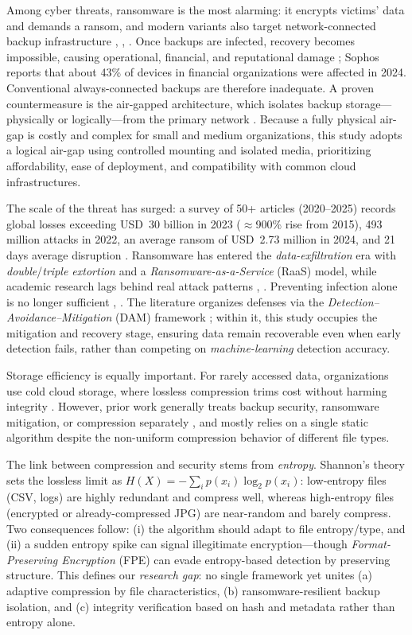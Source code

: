 \documentclass{iaesarticle}
\begin{document}
Among cyber threats, ransomware is the most alarming: it encrypts victims' data and demands a ransom, and modern variants also target network-connected backup infrastructure \cite{6}, \cite{7}, \cite{8}. Once backups are infected, recovery becomes impossible, causing operational, financial, and reputational damage \cite{9}; Sophos reports that about 43\% of devices in financial organizations were affected in 2024. Conventional always-connected backups are therefore inadequate. A proven countermeasure is the air-gapped architecture, which isolates backup storage---physically or logically---from the primary network \cite{10}. Because a fully physical air-gap is costly and complex for small and medium organizations, this study adopts a logical air-gap using controlled mounting and isolated media, prioritizing affordability, ease of deployment, and compatibility with common cloud infrastructures.

The scale of the threat has surged: a survey of 50+ articles (2020--2025) records global losses exceeding USD~30 billion in 2023 ($\approx$900\% rise from 2015), 493 million attacks in 2022, an average ransom of USD~2.73 million in 2024, and 21 days average disruption \cite{41}. Ransomware has entered the \textit{data-exfiltration} era with \textit{double}/\textit{triple extortion} and a \textit{Ransomware-as-a-Service} (RaaS) model, while academic research lags behind real attack patterns \cite{23}, \cite{26}. Preventing infection alone is no longer sufficient \cite{42}, \cite{46}. The literature organizes defenses via the \textit{Detection--Avoidance--Mitigation} (DAM) framework \cite{42}; within it, this study occupies the mitigation and recovery stage, ensuring data remain recoverable even when early detection fails, rather than competing on \textit{machine-learning} detection accuracy.

Storage efficiency is equally important. For rarely accessed data, organizations use cold cloud storage, where lossless compression trims cost without harming integrity \cite{13}. However, prior work generally treats backup security, ransomware mitigation, or compression separately \cite{14}, and mostly relies on a single static algorithm despite the non-uniform compression behavior of different file types.

The link between compression and security stems from \textit{entropy}. Shannon's theory sets the lossless limit as $H(X) = -\sum_{i} p(x_i)\log_2 p(x_i)$: low-entropy files (CSV, logs) are highly redundant and compress well, whereas high-entropy files (encrypted or already-compressed JPG) are near-random and barely compress. Two consequences follow: (i) the algorithm should adapt to file entropy/type, and (ii) a sudden entropy spike can signal illegitimate encryption---though \textit{Format-Preserving Encryption} (FPE) can evade entropy-based detection by preserving structure. This defines our \textit{research gap}: no single framework yet unites (a) adaptive compression by file characteristics, (b) ransomware-resilient backup isolation, and (c) integrity verification based on hash and metadata rather than entropy alone.
\end{document}
